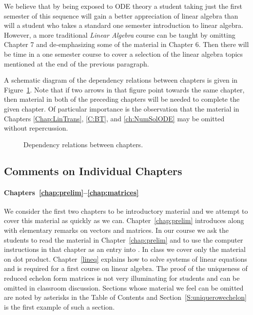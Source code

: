 We believe that by being exposed to ODE theory a student taking just the 
first semester of this sequence will gain a better appreciation of linear 
algebra than will a student who takes a standard one semester introduction 
to linear algebra.  However, a more traditional {\em Linear Algebra\/} course 
can be taught by omitting Chapter 7 and de-emphasizing some of the material 
in Chapter 6.  Then there will be time in a one semester course to cover a 
selection of the linear algebra topics mentioned at the end of the previous 
paragraph. 

A schematic diagram of the dependency relations between chapters is given in
Figure~\ref{F:depdiag}.  Note that if two arrows in that figure point towards 
the same chapter, then material in both of the preceding chapters will be 
needed to complete the given chapter.  Of particular importance is the
observation that the material in Chapters \ref{Chap:LinTrans}, \ref{C:BT}, 
and \ref{ch:NumSolODE} may be omitted without repercussion.

\begin{figure}[htb]
     \centerline{%
     }
     \caption{Dependency relations between chapters.}
     \label{F:depdiag}
\end{figure}

\subsection*{Comments on Individual Chapters}

\paragraph{Chapters~\ref{chap:prelim}--\ref{chap:matrices}}  We consider the 
first two chapters to be introductory material and we attempt to cover this 
material as quickly as we can.  Chapter~\ref{chap:prelim} introduces \Matlab 
along with elementary remarks on vectors and matrices.  In our course we ask 
the students to read the material in 
Chapter~\ref{chap:prelim} and to use the computer instructions in that
chapter as an entry into \Matlabp.  In class we cover only the material on
dot product.  Chapter~\ref{lineq} explains how to solve systems of linear
equations and is required for a first course on linear algebra.  The proof of
the uniqueness of reduced echelon form matrices is not very illuminating
for students and can be omitted in classroom discussion.  Sections whose
material we feel can be omitted are noted by asterisks in the Table of 
Contents and Section~\ref{S:uniquerowechelon} is the first example of such 
a section.

